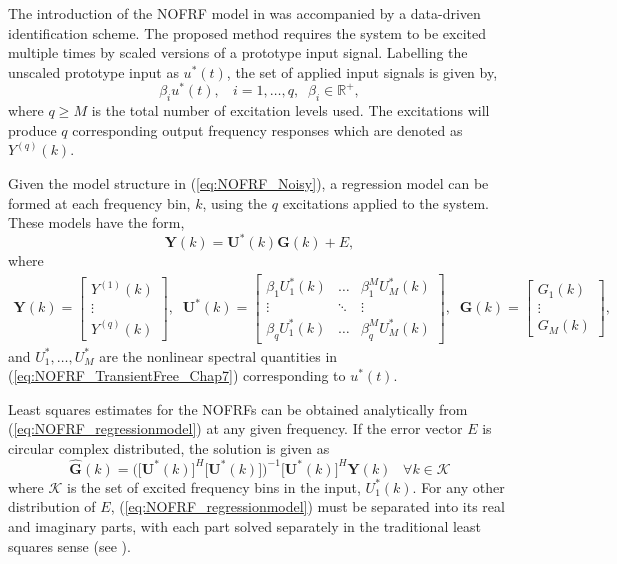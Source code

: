 The introduction of the NOFRF model in \cite{Lang2005} was accompanied by a data-driven identification scheme. The proposed method requires the system to be excited multiple times by scaled versions of a prototype input signal. Labelling the unscaled prototype input as $u^*(t)$, the set of applied input signals is given by,
$$\beta_i u^*(t), \ \ \ \ i = 1, \hdots, q, \; \; \beta_i \in \mathbb{R}^+,$$
where $q \geq M$ is the total number of excitation levels used. The excitations will produce $q$ corresponding output frequency responses which are denoted as $Y^{(q)}(k)$.

Given the model structure in (\ref{eq:NOFRF_Noisy}), a regression model can be formed at each frequency bin, $k$, using the $q$ excitations applied to the system. These models have the form,
\begin{equation}
\mathbf{Y}(k) = \mathbf{U^*}(k) \mathbf{G}(k) + E,
\label{eq:NOFRF_regressionmodel}
\end{equation}
where
\begin{align}
\mathbf{Y}(k) = \begin{bmatrix} Y^{(1)}(k) \\ \vdots \\ Y^{(q)}(k)\end{bmatrix}, \; \; \mathbf{U^*}(k) = \begin{bmatrix} \beta_1 U^*_1(k) & \hdots & \beta_1^M U^*_M(k) \\ \vdots &\ddots & \vdots \\ \beta_q U^*_1(k) & \hdots & \beta_q^M U^*_M(k) \end{bmatrix}, \; \; \mathbf{G}(k) = \begin{bmatrix} G_1(k) \\ \vdots \\ G_M(k)\end{bmatrix},
\end{align} 
and $U^*_1,\hdots,U^*_M$ are the nonlinear spectral quantities in (\ref{eq:NOFRF_TransientFree_Chap7}) corresponding to $u^*(t)$. 

Least squares estimates for the NOFRFs can be obtained analytically from (\ref{eq:NOFRF_regressionmodel}) at any given frequency. If the error vector $E$ is circular complex distributed, the solution is given as
\begin{equation}
\hat{\mathbf{G}}(k) = \bigg( \big[ \mathbf{U^*}(k) \big]^H \big[ \mathbf{U^*}(k) \big] \bigg)^{-1} \big[ \mathbf{U^*}(k) \big]^H \mathbf{Y}(k) \; \; \; \forall k \in \mathcal{K}
\end{equation}
where $\mathcal{K}$ is the set of excited frequency bins in the input, $U^*_1(k)$. For any other distribution of $E$, (\ref{eq:NOFRF_regressionmodel}) must be separated into its real and imaginary parts, with each part solved separately in the traditional least squares sense (see \cite{Lang2005}).  

